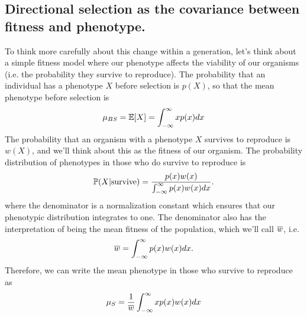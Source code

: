 \subsection{Directional selection as the covariance between fitness and
phenotype.}
To think more carefully about this change within a
generation, let's think about a simple fitness model where our phenotype affects the
viability of our organisms (i.e. the probability they survive to
reproduce). The probability that an individual has a phenotype $X$
before selection is $p(X)$, so that the mean phenotype before
selection is
\begin{equation}
\mu_{BS} = \E[X] =  \int_{-\infty}^{\infty} x p(x) dx
\end{equation}
The probability that an organism with a phenotype $X$ survives to
reproduce is $w(X)$, and we'll think about this as the fitness of
our organism. The probability distribution of phenotypes in those who
do survive to reproduce is
\begin{equation}
\P(X | \textrm{survive}) =  \frac{p(x) w(x)}{
\int_{-\infty}^{\infty} p(x) w(x) dx}.
\end{equation}
where the denominator is a normalization constant which ensures that
our phenotypic distribution integrates to one. The denominator also
has the interpretation of being the mean fitness of the population,
which we'll call $\wbar$, i.e.  
\begin{equation}
\wbar =  \int_{-\infty}^{\infty} p(x) w(x) dx. \label{eqn:pheno_mean_fitness}
\end{equation}
Therefore, we can write the mean phenotype in those who survive to
reproduce as
\begin{equation}
\mu_S = \frac{1}{\wbar}\int_{-\infty}^{\infty} x p(x) w(x) dx
\end{equation}
